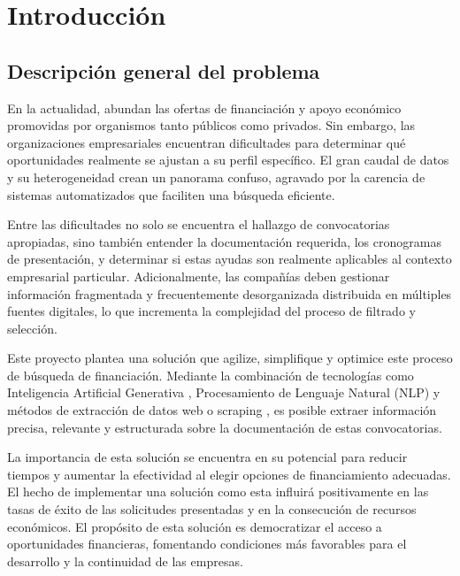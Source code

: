 \chapter{Introducción}
\label{chapter:introduccion}


\section{Descripción general del problema}

En la actualidad, abundan las ofertas de financiación y apoyo económico promovidas por organismos tanto públicos como privados. 
Sin embargo, las organizaciones empresariales encuentran dificultades para determinar qué oportunidades realmente se ajustan a su perfil específico. 
El gran caudal de datos y su heterogeneidad crean un panorama confuso, agravado por la carencia de sistemas automatizados que faciliten una búsqueda eficiente.

Entre las dificultades no solo se encuentra el hallazgo de convocatorias apropiadas, sino también entender la documentación requerida, los cronogramas de presentación, y determinar si estas ayudas son realmente aplicables al contexto empresarial particular. 
Adicionalmente, las compañías deben gestionar información fragmentada y frecuentemente desorganizada distribuida en múltiples fuentes digitales, lo que incrementa la complejidad del proceso de filtrado y selección.

Este proyecto plantea una solución que agilize, simplifique y optimice este proceso de búsqueda de financiación. 
Mediante la combinación de tecnologías como Inteligencia Artificial Generativa \cite{iag}, Procesamiento de Lenguaje Natural (NLP) \cite{Khurana_2022} y métodos de extracción de datos web o scraping \cite{webscraping}, es posible extraer información precisa, relevante y estructurada sobre la documentación de estas convocatorias.

La importancia de esta solución se encuentra en su potencial para reducir tiempos y aumentar la efectividad al elegir opciones de financiamiento adecuadas. 
El hecho de implementar una solución como esta influirá positivamente en las tasas de éxito de las solicitudes presentadas y en la consecución de recursos económicos. 
El propósito de esta solución es democratizar el acceso a oportunidades financieras, fomentando condiciones más favorables para el desarrollo y la continuidad de las empresas.

\newpage

